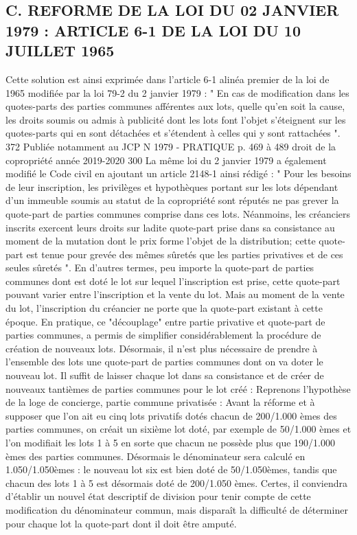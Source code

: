	\subsection{C. REFORME DE LA LOI DU 02 JANVIER 1979 : ARTICLE 6-1 DE LA LOI DU 10 JUILLET 1965}
	
		Cette solution est ainsi exprimée dans l'article 6-1 alinéa premier de la loi de 1965 modifiée par la loi 79-2 du 2 janvier 1979 :
		" En cas de modification dans les quotes-parts des parties communes afférentes aux lots, quelle qu'en soit la cause, les droits soumis ou admis à publicité dont les lots font l'objet s'éteignent sur les quotes-parts qui en sont détachées et s'étendent à celles qui y sont rattachées ".
		372 Publiée notamment au JCP N 1979 - PRATIQUE p. 469 à 489
		droit de la copropriété année 2019-2020
		300
		La même loi du 2 janvier 1979 a également modifié le Code civil en ajoutant un article 2148-1 ainsi rédigé :
		" Pour les besoins de leur inscription, les privilèges et hypothèques portant sur les lots dépendant d'un immeuble soumis au statut de la copropriété sont réputés ne pas grever la quote-part de parties communes comprise dans ces lots.
		Néanmoins, les créanciers inscrits exercent leurs droits sur ladite quote-part prise dans sa consistance au moment de la mutation dont le prix forme l'objet de la distribution; cette quote-part est tenue pour grevée des mêmes sûretés que les parties privatives et de ces seules sûretés ".
		En d'autres termes, peu importe la quote-part de parties communes dont est doté le lot sur lequel l'inscription est prise, cette quote-part pouvant varier entre l'inscription et la vente du lot. Mais au moment de la vente du lot, l'inscription du créancier ne porte que la quote-part existant à cette époque.
		En pratique, ce "découplage" entre partie privative et quote-part de parties communes, a permis de simplifier considérablement la procédure de création de nouveaux lots. Désormais, il n'est plus nécessaire de prendre à l'ensemble des lots une quote-part de parties communes dont on va doter le nouveau lot. Il suffit de laisser chaque lot dans sa consistance et de créer de nouveaux tantièmes de parties communes pour le lot créé :
		Reprenons l'hypothèse de la loge de concierge, partie commune privatisée :
		Avant la réforme et à supposer que l'on ait eu cinq lots privatifs dotés chacun de 200/1.000 èmes des parties communes, on créait un sixième lot doté, par exemple de 50/1.000 èmes et l'on modifiait les lots 1 à 5 en sorte que chacun ne possède plus que 190/1.000 èmes des parties communes.
		Désormais le dénominateur sera calculé en 1.050/1.050èmes : le nouveau lot six est bien doté de 50/1.050èmes, tandis que chacun des lots 1 à 5 est désormais doté de 200/1.050 èmes.
		Certes, il conviendra d'établir un nouvel état descriptif de division pour tenir compte de cette modification du dénominateur commun, mais disparaît la difficulté de déterminer pour chaque lot la quote-part dont il doit être amputé.
	
